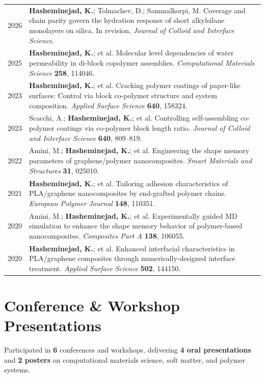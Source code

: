 \documentclass[a4paper,10pt]{article}
\begin{document}
\small
\begin{tabularx}{\linewidth}{@{}K Y@{}}
2026 & \textbf{Hasheminejad, K.}; Tolmachev, D.; Sammalkorpi, M. Coverage and chain parity govern the hydration response of short alkylsilane monolayers on silica. In revision, \textit{Journal of Colloid and Interface Science}. \\
2025 & \textbf{Hasheminejad, K.}; et al. Molecular level dependencies of water permeability in di-block copolymer assemblies. \textit{Computational Materials Science} \textbf{258}, 114046. \\
2023 & \textbf{Hasheminejad, K.}; et al. Cracking polymer coatings of paper-like surfaces: Control via block co-polymer structure and system composition. \textit{Applied Surface Science} \textbf{640}, 158324. \\
2023 & Scacchi, A.; \textbf{Hasheminejad, K.}; et al. Controlling self-assembling co-polymer coatings via co-polymer block length ratio. \textit{Journal of Colloid and Interface Science} \textbf{640}, 809--819. \\
2022 & Amini, M.; \textbf{Hasheminejad, K.}; et al. Engineering the shape memory parameters of graphene/polymer nanocomposites. \textit{Smart Materials and Structures} \textbf{31}, 025010. \\
2021 & \textbf{Hasheminejad, K.}; et al. Tailoring adhesion characteristics of PLA/graphene nanocomposites by end-grafted polymer chains. \textit{European Polymer Journal} \textbf{148}, 110351. \\
2020 & Amini, M.; \textbf{Hasheminejad, K.}; et al. Experimentally guided MD simulation to enhance the shape memory behavior of polymer-based nanocomposites. \textit{Composites Part A} \textbf{138}, 106055. \\
2020 & \textbf{Hasheminejad, K.}; et al. Enhanced interfacial characteristics in PLA/graphene composites through numerically-designed interface treatment. \textit{Applied Surface Science} \textbf{502}, 144150. \\
\end{tabularx}
\normalsize

\section{Conference \& Workshop Presentations}
Participated in \textbf{6} conferences and workshops, delivering \textbf{4 oral presentations} and \textbf{2 posters} on computational materials science, soft matter, and polymer systems.
\vspace{0.3em}
\end{document}
